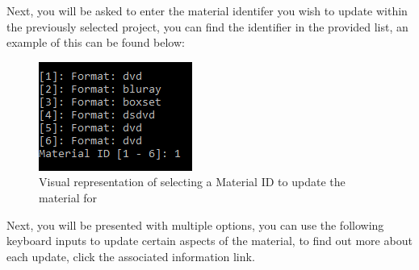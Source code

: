\documentclass[
  english,
  a4paper,
,tablecaptionabove
]{scrartcl}
\begin{document}
Next, you will be asked to enter the material identifer you wish to
update within the previously selected project, you can find the
identifier in the provided list, an example of this can be found below:

\begin{figure}
\centering
\includegraphics{images/user-guide/maintenance-mode/update-project-material-select-material-id.png}
\caption{Visual representation of selecting a Material ID to update the
material for}
\end{figure}

Next, you will be presented with multiple options, you can use the
following keyboard inputs to update certain aspects of the material, to
find out more about each update, click the associated information link.
\end{document}
